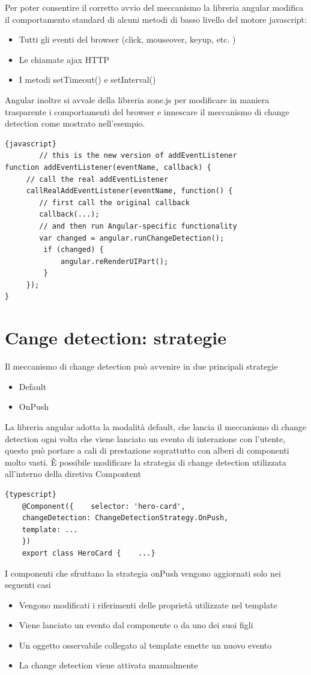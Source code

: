 Per poter consentire il corretto avvio del meccanismo la libreria angular modifica il comportamento standard di alcuni metodi di basso livello del motore javascript:
\begin{itemize}
    \item Tutti gli eventi del browser (click, mouseover, keyup, etc. )
    \item Le chiamate ajax HTTP
    \item I metodi setTimeout() e setInterval()
\end{itemize}
Angular inoltre si avvale della libreria zone.js per modificare in maniera trasparente i comportamenti del browser e innescare il meccanismo di change detection come mostrato nell'esempio.
\newline
\begin{lstlisting}{javascript}
        // this is the new version of addEventListener
function addEventListener(eventName, callback) {
     // call the real addEventListener
     callRealAddEventListener(eventName, function() {
        // first call the original callback
        callback(...);
        // and then run Angular-specific functionality
        var changed = angular.runChangeDetection();
         if (changed) {
             angular.reRenderUIPart();
         }
     });
}

\end{lstlisting}
\cite{angular-doc}

\section{Cange detection: strategie}
Il meccanismo di change detection può avvenire in due principali strategie
\begin{itemize}
    \item Default
    \item OnPush
\end{itemize}
La libreria angular adotta la modalità default, che lancia il meccanismo di change detection ogni volta che viene lanciato un evento di interazione con l'utente, questo può portare a cali di prestazione soprattutto con alberi di componenti molto vasti.
È possibile modificare la strategia di change detection utilizzata all'interno della diretiva Compontent
\begin{lstlisting}{typescript}
    @Component({    selector: 'hero-card',
    changeDetection: ChangeDetectionStrategy.OnPush,
    template: ...
    })
    export class HeroCard {    ...}
\end{lstlisting}
I componenti che sfruttano la strategia onPush vengono aggiornati solo nei seguenti casi
\begin{itemize}
    \item Vengono modificati i riferimenti delle proprietà utilizzate nel template
    \item Viene lanciato un evento dal componente o da uno dei suoi figli
    \item Un oggetto osservabile collegato al template emette un nuovo evento
    \item La change detection viene attivata manualmente
\end{itemize}

